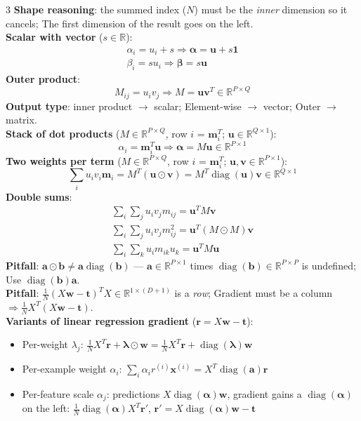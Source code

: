 \documentclass[10pt]{article}
\newcommand{\vx}{\mathbf{x}}
\newcommand{\vw}{\mathbf{w}}
\newcommand{\vt}{\mathbf{t}}
\newcommand{\vu}{\mathbf{u}}
\newcommand{\vv}{\mathbf{v}}
\newcommand{\vr}{\mathbf{r}}
\begin{document}
\begin{multicols*}{3}
\textbf{Shape reasoning}: the summed index ($N$) must be the \emph{inner} dimension so it cancels; The first dimension of the result goes on the left.\\
\textbf{Scalar with vector} ($s\in\mathbb{R}$):
\begin{gather*} \alpha_i = u_i + s \Rightarrow \boldsymbol{\alpha} = \vu + s\mathbf{1}\\ \beta_i = s u_i \Rightarrow \boldsymbol{\beta} = s\vu \end{gather*}
\textbf{Outer product}:
\[ M_{ij} = u_i v_j \Rightarrow M = \vu\vv^T \in\mathbb R^{P\times Q} \]
\textbf{Output type}: inner product $\to$ scalar; Element-wise $\to$ vector; Outer $\to$ matrix.\\
\textbf{Stack of dot products} ($M\in\mathbb R^{P\times Q}$, row $i$ = $\mathbf m_i^T$; $\vu\in\mathbb R^{Q\times1}$):
\[ \alpha_i = \mathbf{m}_i^T\vu \Rightarrow \boldsymbol{\alpha} = M\vu\in\mathbb R^{P\times1} \]
\textbf{Two weights per term} ($M\in\mathbb R^{P\times Q}$, row $i$ = $\mathbf m_i^T$; $\vu,\vv\in\mathbb R^{P\times1}$):
\[ \textstyle\sum_i u_i v_i\mathbf{m}_i = M^T(\vu\odot\vv) = M^T\operatorname{diag}(\vu)\vv\in\mathbb R^{Q\times1} \]
\textbf{Double sums}:
\begin{gather*}
\textstyle\sum_i\sum_j u_i v_j m_{ij} = \vu^T M\vv\\ \textstyle\sum_i\sum_j u_i v_j m_{ij}^2 = \vu^T(M\odot M)\vv\\
\textstyle\sum_i\sum_k u_i m_{ik} u_k = \vu^T M\vu
\end{gather*}
\textbf{Pitfall}: $\mathbf{a}\odot\mathbf{b} \ne \mathbf{a}\operatorname{diag}(\mathbf{b})$ --- $\mathbf a\in\mathbb R^{P\times1}$ times $\operatorname{diag}(\mathbf b)\in\mathbb R^{P\times P}$ is undefined; Use $\operatorname{diag}(\mathbf{b})\mathbf{a}$.\\
\textbf{Pitfall}: $\frac1N(X\vw-\vt)^T X\in\mathbb R^{1\times(D+1)}$ is a \emph{row}; Gradient must be a column $\Rightarrow \frac1N X^T(X\vw-\vt)$.\\
\textbf{Variants of linear regression gradient} ($\vr = X\vw-\vt$):
\begin{itemize}
  \item Per-weight $\lambda_j$: $\frac1N X^T\vr + \boldsymbol{\lambda}\odot\vw = \frac1N X^T\vr + \operatorname{diag}(\boldsymbol{\lambda})\vw$
  \item Per-example weight $\alpha_i$: $\sum_i \alpha_i r^{(i)}\vx^{(i)} = X^T\operatorname{diag}(\mathbf{a})\vr$
  \item \raggedright Per-feature scale $\alpha_j$: predictions $X\operatorname{diag}(\boldsymbol{\alpha})\vw$, gradient gains a $\operatorname{diag}(\boldsymbol{\alpha})$ on the left: $\frac1N\operatorname{diag}(\boldsymbol{\alpha})X^T\vr'$, $\vr' = X\operatorname{diag}(\boldsymbol{\alpha})\vw-\vt$

\end{itemize}
\end{multicols*}
\end{document}
